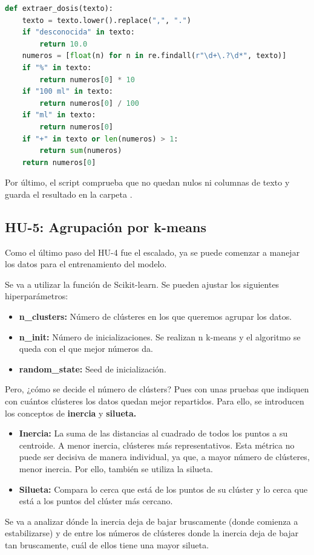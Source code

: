 \documentclass[11pt,a4paper]{article}
\begin{document}
\noindent\begin{minipage}{\linewidth}
\begin{lstlisting}[language=Python, caption={Función que convierte el texto de la dosis en un número.}, label={lst:hu4_funcion_extraer_dosis}]
def extraer_dosis(texto):
    texto = texto.lower().replace(",", ".")
    if "desconocida" in texto:
        return 10.0
    numeros = [float(n) for n in re.findall(r"\d+\.?\d*", texto)]
    if "%" in texto:
        return numeros[0] * 10
    if "100 ml" in texto:
        return numeros[0] / 100
    if "ml" in texto:
        return numeros[0]
    if "+" in texto or len(numeros) > 1:
        return sum(numeros)
    return numeros[0]
\end{lstlisting}
\end{minipage}

Por último, el script comprueba que no quedan nulos ni columnas de texto y guarda el resultado
en la carpeta .

\subsection{HU-5: Agrupación por k-means}
Como el último paso del HU-4 fue el escalado, ya se puede comenzar a manejar los datos para
el entrenamiento del modelo.

Se va a utilizar la función  de Scikit-learn. Se pueden ajustar los siguientes
hiperparámetros:
\begin{itemize}
  \item \textbf{n\_clusters:} Número de clústeres en los que queremos agrupar los datos.
  \item \textbf{n\_init:} Número de inicializaciones. Se realizan n k-means y el algoritmo se queda con el
        que mejor números da.
  \item \textbf{random\_state:} Seed de inicialización.
\end{itemize}
Pero, ¿cómo se decide el número de clústers? Pues con unas pruebas que indiquen con cuántos
clústeres los datos quedan mejor repartidos. Para ello, se introducen los conceptos de \textbf{inercia} y
\textbf{silueta.}
\begin{itemize}
  \item \textbf{Inercia:} La suma de las distancias al cuadrado de todos los puntos a su centroide. A
        menor inercia, clústeres más representativos. Esta métrica no puede ser decisiva de
        manera individual, ya que, a mayor número de clústeres, menor inercia. Por ello, también
        se utiliza la silueta.
  \item \textbf{Silueta:} Compara lo cerca que está de los puntos de su clúster y lo cerca que está a los
        puntos del clúster más cercano.
\end{itemize}
Se va a analizar dónde la inercia deja de bajar bruscamente (donde comienza a estabilizarse) y
de entre los números de clústeres donde la inercia deja de bajar tan bruscamente, cuál de ellos
tiene una mayor silueta.
\end{document}
